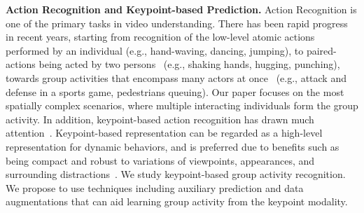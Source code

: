 \documentclass[runningheads]{llncs}
\begin{document}
\noindent \textbf{Action Recognition and Keypoint-based Prediction.}
Action Recognition is one of the primary tasks in video understanding. 
There has been rapid progress
in recent years,
starting from recognition of the 
low-level 
atomic actions performed by an 
individual 
(e.g., hand-waving, dancing, jumping),
to paired-actions 
being 
acted by two persons~\cite{perez2021interaction,shu2019hierarchical,yun2012two,kong2012learning} (e.g., shaking hands, hugging, punching), 
towards group activities that encompass many actors at once~\cite{choi2009they,ibrahim2016hierarchical,ramanathan2016detecting,GIRN} (e.g., attack and defense in a sports game, pedestrians queuing).
Our paper focuses on the most spatially complex scenarios, where multiple interacting individuals form the group activity.
In addition, keypoint-based action recognition has drawn much attention~\cite{li2020dynamic,yan2018spatial,zhu2016co,nguyen2021geomnet,zhao2021learning}.
Keypoint-based representation can be regarded as a high-level representation for dynamic behaviors, and is preferred due to  
benefits such as being 
compact and robust to variations of viewpoints, appearances, and surrounding distractions~\cite{dang2020sensor,lin2020ms2l}. 
We study keypoint-based 
group activity recognition. 
We propose to use
techniques 
including auxiliary prediction and data augmentations 
that can 
aid 
learning group activity from the keypoint modality.






 
\end{document}
